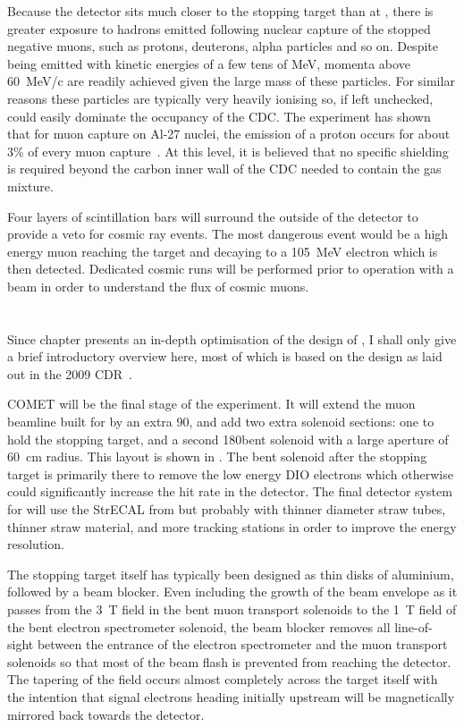 Because the \phaseI detector sits much closer to the stopping target than at \phaseII, there is greater exposure to hadrons emitted following nuclear capture of the stopped negative muons, such as protons, deuterons, alpha particles and so on.
Despite being emitted with kinetic energies of a few tens of MeV, momenta above 60~MeV/c are readily achieved given the large mass of these particles.
For similar reasons these particles are typically very heavily ionising so, if left unchecked, could easily dominate the occupancy of the \ac{CDC}.
The \alcap experiment has shown that for muon capture on Al-27 nuclei, the emission of a proton occurs for about 3\% of every muon capture~\cite{NamThesis}.
At this level, it is believed that no specific shielding is required beyond the carbon inner wall of the \ac{CDC} needed to contain the gas mixture.

Four layers of scintillation bars will surround the outside of the detector to provide a veto for cosmic ray events.
The most dangerous event would be a high energy muon reaching the target and decaying to a 105~MeV electron which is then detected. 
Dedicated cosmic runs will be performed prior to operation with a beam in order to understand the flux of cosmic muons.

\section{\COMET \phaseII}
\FigPhaseII
Since chapter  presents an in-depth optimisation of the design of \phaseII, I shall only give a brief introductory overview here, most of which is based on the design as laid out in the 2009 CDR~\cite{CDRphase2}.

COMET \phaseII will be the final stage of the experiment.
It will extend the muon beamline built for \phaseI by an extra 90\degree, and add two extra solenoid sections: one to hold the stopping target, and a second 180\degree bent solenoid with a large aperture of 60~cm radius.
This layout is shown in .
The bent solenoid after the stopping target is primarily there to remove the low energy \ac{DIO} electrons which otherwise could significantly increase the hit rate in the detector.
The final detector system for \phaseII will use the \ac{StrECAL} from \phaseI but probably with thinner diameter straw tubes, thinner straw material, and more tracking stations in order to improve the energy resolution.

The stopping target itself has typically been designed as thin disks of aluminium, followed by a beam blocker.  
Even including the growth of the beam envelope as it passes from the 3~T field in the bent muon transport solenoids to the 1~T field of the bent electron spectrometer solenoid, the beam blocker removes all line-of-sight between the entrance of the electron spectrometer and the muon transport solenoids so that most of the beam flash is prevented from reaching the detector.
The tapering of the field occurs almost completely across the target itself with the intention that signal electrons heading initially upstream will be magnetically mirrored back towards the detector.

